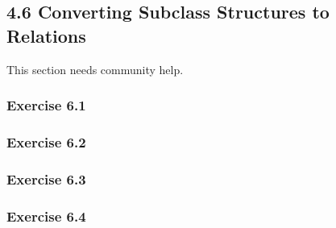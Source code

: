 \documentclass[../../main.tex]{subfiles}
\begin{document}
\subsection{4.6 Converting Subclass Structures to Relations}

This section needs community help.

\subsubsection*{Exercise 6.1}

\subsubsection*{Exercise 6.2}

\subsubsection*{Exercise 6.3}

\subsubsection*{Exercise 6.4}
\end{document}
